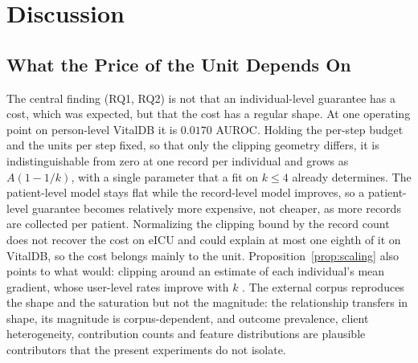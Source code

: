\section{Discussion}
\label{sec:discussion}

\subsection{What the Price of the Unit Depends On}
The central finding (RQ1, RQ2) is not that an individual-level guarantee has a cost,
which was expected, but that the cost has a regular shape. At one operating
point on person-level VitalDB it is $0.0170$ AUROC. Holding the per-step budget and the units per step
fixed, so that only the clipping geometry differs, it is indistinguishable
from zero at one record per individual and grows as $A(1-1/k)$, with a single
parameter that a fit on $k \le 4$ already determines. The patient-level model
stays flat while the record-level model improves, so a patient-level guarantee
becomes relatively more expensive, not cheaper, as more records are collected
per patient. Normalizing the clipping bound by the record count does not
recover the cost on eICU and could explain at most one eighth of it on VitalDB,
so the cost belongs mainly to the unit. Proposition~\ref{prop:scaling}
also points to what would: clipping around an estimate of each individual's
mean gradient, whose user-level rates improve with $k$ \cite{ref32}. The
external corpus reproduces the shape and the saturation but not the
magnitude: the relationship transfers in shape, its magnitude is
corpus-dependent, and outcome prevalence, client heterogeneity, contribution
counts and feature distributions are plausible contributors that the present
experiments do not isolate.

